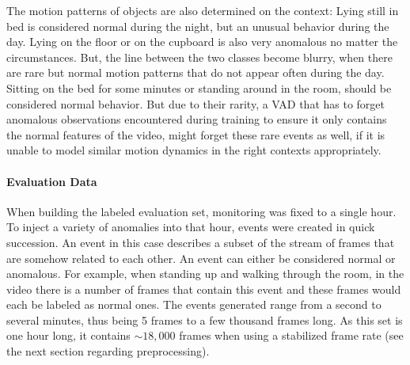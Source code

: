 The motion patterns of objects are also determined on the context: Lying still in bed is considered normal during the night, but an unusual behavior during the day. Lying on the floor or on the cupboard is also very anomalous no matter the circumstances. But, the line between the two classes become blurry, when there are rare but normal motion patterns that do not appear often during the day. Sitting on the bed for some minutes or standing around in the room, should be considered normal behavior. But due to their rarity, a VAD that has to forget anomalous observations encountered during training to ensure it only contains the normal features of the video, might forget these rare events as well, if it is unable to model similar motion dynamics in the right contexts appropriately.

\paragraph{Evaluation Data}
When building the labeled evaluation set, monitoring was fixed to a single hour. To inject a variety of anomalies into that hour, events were created in quick succession. An event in this case describes a subset of the stream of frames that are somehow related to each other. An event can either be considered normal or anomalous. For example, when standing up and walking through the room, in the video there is a number of frames that contain this event and these frames would each be labeled as normal ones. The events generated range from a second to several minutes, thus being 5 frames to a few thousand frames long. As this set is one hour long, it contains $\sim 18,000$ frames when using a stabilized frame rate (see the next section regarding preprocessing). 


